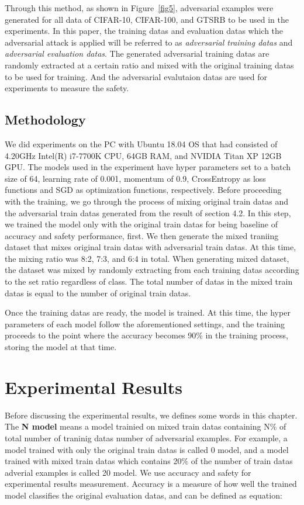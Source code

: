\documentclass[journal,article,submit,moreauthors,pdftex]{Definitions/mdpi}
\begin{document}
Through this method, as shown in Figure~\ref{fig5}, adversarial examples were generated for all data of CIFAR-10, CIFAR-100, and GTSRB to be used in the experiments.
In this paper, the training datas and evaluation datas which the adversarial attack is applied will be referred to as {\it adversarial training datas} and {\it adversarial evaluation datas}.
The generated adversarial training datas are randomly extracted at a certain ratio and mixed with the original training datas to be used for training. And the adversarial evalutaion datas are used for experiments to measure the safety.

\subsection{Methodology}

We did experiments on the PC with Ubuntu 18.04 OS that had consisted of 4.20GHz Intel(R) i7-7700K CPU, 64GB RAM, and NVIDIA Titan XP 12GB GPU. The models used in the experiment have hyper parameters set to a batch size of 64, learning rate of 0.001, momentum of 0.9, CrossEntropy as loss functions and SGD as optimization functions, respectively.
Before proceeding with the training, we go through the process of mixing original train datas and the adversarial train datas generated from the result of section 4.2.
In this step, we trained the model only with the original train datas for being baseline of accuracy and safety performance, first. We then generate the mixed traniing dataset that mixes original train datas with adversarial train datas.
At this time, the mixing ratio was 8:2, 7:3, and 6:4 in total. When generating mixed dataset, the dataset was mixed by randomly extracting from each training datas according to the set ratio regardless of class.
The total number of datas in the mixed train datas is equal to the number of original train datas.

Once the training datas are ready, the model is trained. At this time, the hyper parameters of each model follow the aforementioned settings, and the training proceeds to the point where the accuracy becomes 90\% in the training process, storing the model at that time.

\section{Experimental Results}

Before discussing the experimental results, we defines some words in this chapter. The {\bf N model} means a model trainied on mixed train datas containing N\% of total number of traninig datas number of adversarial examples.
For example, a model trained with only the original train datas is called 0 model, and a model trained with mixed train datas which contains 20\% of the number of train datas adverial examples is called 20 model.
We use accuracy and safety for experimental results measurement. Accuracy is a measure of how well the trained model classifies the original evaluation datas, and can be defined as equation:
\end{document}
